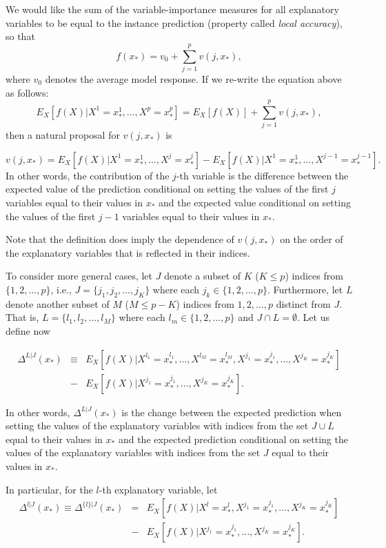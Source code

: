 \documentclass[12pt,]{krantz}
\begin{document}
We would like the sum of the variable-importance measures for all explanatory variables to be equal to the instance prediction (property called \emph{local accuracy}), so that
\[
f(x_*) = v_0 + \sum_{j=1}^p v(j, x_*),
\]
where \(v_0\) denotes the average model response. If we re-write the equation above as follows:
\[
E_X[f(X)|X^1 = x^1_*, \ldots, X^p = x^p_*] = E_X[f(X)] + \sum_{j=1}^p v(j, x_*),
\]
then a natural proposal for \(v(j, x_*)\) is

\[
v(j, x_*) = E_X[f(X) | X^1 = x^1_*, \ldots, X^j = x^j_*] - E_X[f(X) | X^1 = x^1_*, \ldots, X^{j-1} = x^{j-1}_*]. 
\]
In other words, the contribution of the \(j\)-th variable is the difference between the expected value of the prediction conditional on setting the values of the first \(j\) variables equal to their values in \(x_*\) and the expected value conditional on setting the values of the first \(j-1\) variables equal to their values in \(x_*\).

Note that the definition does imply the dependence of \(v(j, x_*)\) on the order of the explanatory variables that is reflected in their indices.

To consider more general cases, let \(J\) denote a subset of \(K\) (\(K\leq p\)) indices from \(\{1,2,\ldots,p\}\), i.e., \(J=\{j_1,j_2,\ldots,j_K\}\) where each \(j_k \in \{1,2,\ldots,p\}\). Furthermore, let \(L\) denote another subset of \(M\) (\(M \leq p-K\)) indices from \({1,2,\ldots,p}\) distinct from \(J\). That is, \(L=\{l_1,l_2,\ldots,l_M\}\) where each \(l_m \in \{1,2,\ldots,p\}\) and \(J \cap L = \emptyset\). Let us define now

\begin{eqnarray}
\Delta^{L|J}(x_*) &\equiv& E_X[f(X) | X^{l_1} = x_*^{l_1},\ldots,X^{l_M} = x_*^{l_M},X^{j_1} = x_*^{j_1},\ldots,X^{j_K} = x_*^{j_K}]\\
&-& E_X[f(X) | X^{j_1} = x_*^{j_1},\ldots,X^{j_K} = x_*^{j_K}].
\end{eqnarray}

In other words, \(\Delta^{L|J}(x_*)\) is the change between the expected prediction when setting the values of the explanatory variables with indices from the set \(J \cup L\) equal to their values in \(x_*\) and the expected prediction conditional on setting the values of the explanatory variables with indices from the set \(J\) equal to their values in \(x_*\).

In particular, for the \(l\)-th explanatory variable, let
\begin{eqnarray}
\Delta^{l|J}(x_*) \equiv \Delta^{\{l\}|J}(x_*) &=& E_X[f(X) | X^{l} = x_*^{l},X^{j_1} = x_*^{j_1},\ldots,X^{j_K} = x_*^{j_K}]\\
&-& E_X[f(X) | X^{j_1} = x_*^{j_1},\ldots,X^{j_K} = x_*^{j_K}].
\end{eqnarray}
\end{document}
